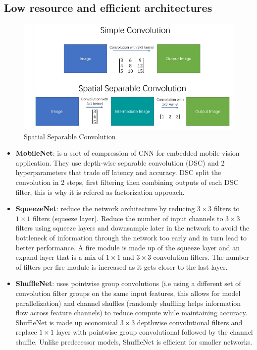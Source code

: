 \subsection{Low resource and efficient architectures}
\begin{figure}[!ht]
    \centering
    \includegraphics[width=0.5\linewidth]{img/CNN/spatialConv.png}
    \caption{Spatial Separable Convolution}
    \label{fig:spatialConv}
\end{figure}
\begin{itemize}
    \item \textbf{MobileNet}: is a sort of compression of CNN for embedded mobile vision
        application. They use depth-wise separable convolution (DSC) and 2 hyperparameters
        that trade off latency and accuracy. DSC split the convolution in 2 steps, 
        first filtering then combining outputs of each DSC filter, this is why it 
        is refered as factorization approach.
    \item \textbf{SqueezeNet}: reduce the network architecture by reducing $3\times3$ filters 
        to $1\times1$ filters (squeeze layer). Reduce the number of input channels to $3\times3$ 
        filters using squeeze layers and downsample later in the network to avoid the bottleneck of 
        information through the network too early and in turn lead to better performance. A fire module is 
        made up of the squeeze layer and an expand layer that is a mix of $1\times1$ and $3\times3$ 
        convolution filters. The number of filters per fire module is increased as it gets closer to the 
        last layer.
    \item \textbf{ShuffleNet}: uses pointwise group convolutions (i.e using a different set of 
        convolution filter groups on the same input features, this allows for model parallelization) and 
        channel shuffles (randomly shuffling helps information flow across feature channels) to reduce 
        compute while maintaining accuracy. ShuffleNet is made up economical $3\times3$ depthwise 
        convolutional filters and replace $1\times1$ layer with pointwise group convolutional followed by 
        the channel shuffle. Unlike predecessor models, ShuffleNet is efficient for smaller networks.

\end{itemize}
